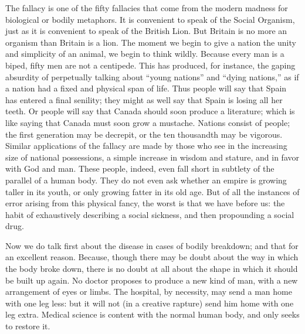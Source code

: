 \documentclass{book}
\begin{document}
The fallacy is one of the fifty fallacies that come from the modern madness for biological or bodily metaphors. It is convenient to speak of the Social Organism, just as it is convenient to speak of the British Lion. But Britain is no more an organism than Britain is a lion. The moment we begin to give a nation the unity and simplicity of an animal, we begin to think wildly. Because every man is a biped, fifty men are not a centipede. This has produced, for instance, the gaping absurdity of perpetually talking about “young nations” and “dying nations,” as if a nation had a fixed and physical span of life. Thus people will say that Spain has entered a final senility; they might as well say that Spain is losing all her teeth. Or people will say that Canada should soon produce a literature; which is like saying that Canada must soon grow a mustache. Nations consist of people; the first generation may be decrepit, or the ten thousandth may be vigorous. Similar applications of the fallacy are made by those who see in the increasing size of national possessions, a simple increase in wisdom and stature, and in favor with God and man. These people, indeed, even fall short in subtlety of the parallel of a human body. They do not even ask whether an empire is growing taller in its youth, or only growing fatter in its old age. But of all the instances of error arising from this physical fancy, the worst is that we have before us: the habit of exhaustively describing a social sickness, and then propounding a social drug.

Now we do talk first about the disease in cases of bodily breakdown; and that for an excellent reason. Because, though there may be doubt about the way in which the body broke down, there is no doubt at all about the shape in which it should be built up again. No doctor proposes to produce a new kind of man, with a new arrangement of eyes or limbs. The hospital, by necessity, may send a man home with one leg less: but it will not (in a creative rapture) send him home with one leg extra. Medical science is content with the normal human body, and only seeks to restore it.
\end{document}
